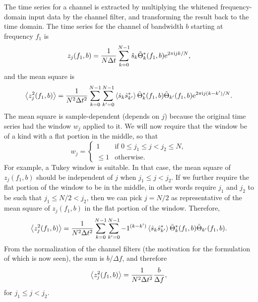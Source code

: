 \documentclass{article}
\begin{document}
The time series for a channel is extracted by multiplying the whitened
frequency-domain input data by the channel filter, and transforming the
result back to the time domain.  The time series for the channel of
bandwidth \(b\) starting at frequency \(f_{1}\) is
\begin{equation}
\label{eqn1}
z_{j}(f_{1}, b)
   = \frac{1}{N \Delta t} \sum_{k = 0}^{N - 1} \hat{s}_{k}
   \tilde{\Theta}^{*}_{k}(f_{1}, b) \mathrm{e}^{2 \pi \mathrm{i} j k / N},
\end{equation}
and the mean square is
\begin{equation}
\left\langle z_{j}^{2}(f_{1}, b)\right\rangle
   = \frac{1}{N^{2} \Delta t^{2}} \sum_{k = 0}^{N - 1} \sum_{k' = 0}^{N -
   1} \left\langle\hat{s}_{k} \hat{s}^{*}_{k'}\right\rangle
   \tilde{\Theta}^{*}_{k}(f_{1}, b) \tilde{\Theta}_{k'}(f_{1}, b) \mathrm{e}^{2
   \pi \mathrm{i} j (k - k') / N}.
\end{equation}
The mean square is sample-dependent (depends on \(j\)) because the original
time series had the window \(w_{j}\) applied to it.  We will now require
that the window be of a kind with a flat portion in the middle, so that
\begin{equation}
w_{j}
   = \begin{cases}
   1 & \text{if \(0 \leq j_{1} \leq j < j_{2} \leq N\)},
   \\
   \leq 1 & \text{otherwise}.
   \end{cases}
\end{equation}
For example, a Tukey window is suitable.  In that case, the mean square of
\(z_{j}(f_{1}, b)\) should be independent of \(j\) when \(j_{1} \leq j <
j_{2}\).  If we further require the flat portion of the window to be in the
middle, in other words require \(j_{1}\) and \(j_{2}\) to be such that
\(j_{1} \leq N / 2 < j_{2}\), then we can pick \(j = N / 2\) as
representative of the mean square of \(z_{j}(f_{1}, b)\) in the flat
portion of the window.  Therefore,
\begin{equation}
\left\langle z_{j}^{2}(f_{1}, b)\right\rangle
   = \frac{1}{N^{2} \Delta t^{2}} \sum_{k = 0}^{N - 1} \sum_{k' = 0}^{N -
   1} -1^{(k - k')} \left\langle\hat{s}_{k} \hat{s}^{*}_{k'}\right\rangle
   \tilde{\Theta}^{*}_{k}(f_{1}, b) \tilde{\Theta}_{k'}(f_{1}, b).
\end{equation}
From the normalization of the channel filters (the motivation for the
formulation of which is now seen), the sum is \(b / \Delta f\), and
therefore
\begin{equation}
\left\langle z_{j}^{2}(f_{1}, b)\right\rangle
   = \frac{1}{N^{2} \Delta t^{2}} \frac{b}{\Delta f},
\end{equation}
for \(j_{1} \leq j < j_{2}\).
\end{document}
